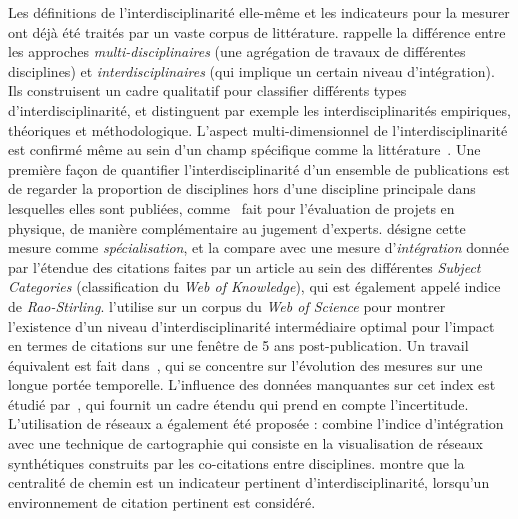 {Les définitions de l'interdisciplinarité elle-même et les indicateurs pour la mesurer ont déjà été traités par un vaste corpus de littérature. \cite{huutoniemi2010analyzing} rappelle la différence entre les approches \emph{multi-disciplinaires} (une agrégation de travaux de différentes disciplines) et \emph{interdisciplinaires} (qui implique un certain niveau d'intégration). Ils construisent un cadre qualitatif pour classifier différents types d'interdisciplinarité, et distinguent par exemple les interdisciplinarités empiriques, théoriques et méthodologique. L'aspect multi-dimensionnel de l'interdisciplinarité est confirmé même au sein d'un champ spécifique comme la littérature~\cite{austin1996defining}. Une première façon de quantifier l'interdisciplinarité d'un ensemble de publications est de regarder la proportion de disciplines hors d'une discipline principale dans lesquelles elles sont publiées, comme~\cite{rinia2002impact} fait pour l'évaluation de projets en physique, de manière complémentaire au jugement d'experts. \cite{porter2007measuring} désigne cette mesure comme \emph{spécialisation}, et la compare avec une mesure d'\emph{intégration} donnée par l'étendue des citations faites par un article au sein des différentes \emph{Subject Categories} (classification du \emph{Web of Knowledge}), qui est également appelé indice de \emph{Rao-Stirling}. \cite{lariviere2010relationship} l'utilise sur un corpus du \emph{Web of Science} pour montrer l'existence d'un niveau d'interdisciplinarité intermédiaire optimal pour l'impact en termes de citations sur une fenêtre de 5 ans post-publication. Un travail équivalent est fait dans~\cite{lariviere201410}, qui se concentre sur l'évolution des mesures sur une longue portée temporelle. L'influence des données manquantes sur cet index est étudié par~\cite{moreno2016uncertainty}, qui fournit un cadre étendu qui prend en compte l'incertitude. L'utilisation de réseaux a également été proposée : \cite{porter2009science} combine l'indice d'intégration avec une technique de cartographie qui consiste en la visualisation de réseaux synthétiques construits par les co-citations entre disciplines. \cite{leydesdorff2007betweenness} montre que la centralité de chemin est un indicateur pertinent d'interdisciplinarité, lorsqu'un environnement de citation pertinent est considéré.
}










